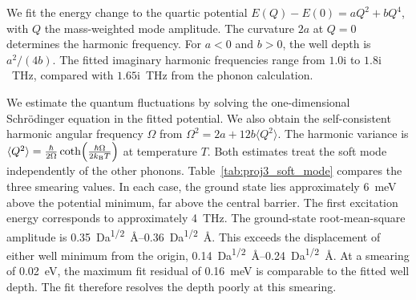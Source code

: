 We fit the energy change to the quartic potential $E(Q)-E(0)=aQ^{2}+bQ^{4}$, with $Q$ the mass-weighted mode amplitude.
The curvature $2a$ at $Q=0$ determines the harmonic frequency.
For $a<0$ and $b>0$, the well depth is $a^{2}/(4b)$.
The fitted imaginary harmonic frequencies range from $1.0\mathrm{i}$ to $1.8\mathrm{i}$~\unit{\tera\hertz}, compared with $1.65\mathrm{i}$~\unit{\tera\hertz} from the phonon calculation.

We estimate the quantum fluctuations by solving the one-dimensional Schr\"odinger equation in the fitted potential.
We also obtain the self-consistent harmonic angular frequency $\Omega$ from $\Omega^{2}=2a+12b\langle Q^{2}\rangle$.
The harmonic variance is $\langle Q^{2}\rangle=\frac{\hbar}{2\Omega}\coth\!\left(\frac{\hbar\Omega}{2k_\mathrm{B} T}\right)$ at temperature $T$.
Both estimates treat the soft mode independently of the other phonons.
Table~\ref{tab:proj3_soft_mode} compares the three smearing values.
In each case, the ground state lies approximately \qty{6}{\milli\electronvolt} above the potential minimum, far above the central barrier.
The first excitation energy corresponds to approximately \qty{4}{\tera\hertz}.
The ground-state root-mean-square amplitude is \qtyrange{0.35}{0.36}{\dalton\tothe{1/2}\angstrom}.
This exceeds the displacement of either well minimum from the origin, \qtyrange{0.14}{0.24}{\dalton\tothe{1/2}\angstrom}.
At a smearing of \qty{0.02}{\electronvolt}, the maximum fit residual of \qty{0.16}{\milli\electronvolt} is comparable to the fitted well depth.
The fit therefore resolves the depth poorly at this smearing.

